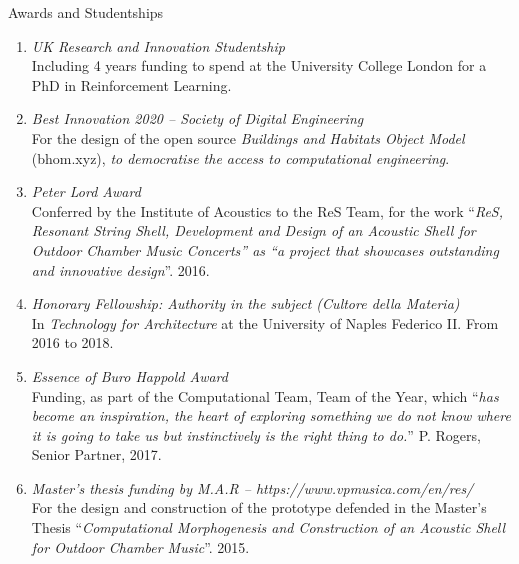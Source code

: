 \begin{rSection}{Awards and Studentships}
    \begin{enumerate}[leftmargin=0.45cm, itemsep=0em, topsep=0.5em, parsep=0.2em]
        \item
        \emph{UK Research and Innovation Studentship} \\
        Including 4 years funding to spend at the University College London for a PhD in Reinforcement Learning.
        \item
        \emph{Best Innovation 2020 – Society of Digital Engineering} \\
        For the design of the open source \textit{Buildings and Habitats Object Model} (bhom.xyz), \textit{to democratise the access to computational engineering}.
        \item
        \emph{Peter Lord Award} \\
        Conferred by the Institute of Acoustics to the ReS Team, for the work “\textit{ReS, Resonant String Shell, Development and Design of an Acoustic Shell for Outdoor Chamber Music Concerts” as “a project that showcases outstanding and innovative design}”. 2016.
        \item
        \emph{Honorary Fellowship: Authority in the subject (Cultore della Materia)} \\
        In \textit{Technology for Architecture} at the University of Naples Federico II.
        From 2016 to 2018.
        \item
        \emph{Essence of Buro Happold Award} \\
        Funding, as part of the Computational Team, Team of the Year, which “\textit{has become an inspiration, the heart of exploring something we do not know where it is going to take us but instinctively is the right thing to do.}” P. Rogers, Senior Partner, 2017.
        \item
        \emph{Master’s thesis funding by M.A.R – https://www.vpmusica.com/en/res/}  \\
    For the design and construction of the prototype defended in the Master’s Thesis “\textit{Computational Morphogenesis and Construction of an Acoustic Shell for Outdoor Chamber Music}”. 2015.
    \end{enumerate}
\end{rSection}